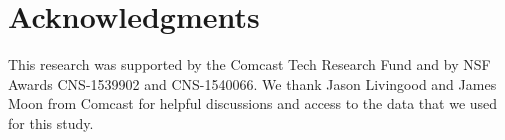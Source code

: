 \section*{Acknowledgments}

This research was supported by the Comcast Tech Research Fund and by NSF
Awards CNS-1539902 and CNS-1540066. We thank Jason Livingood and James
Moon from Comcast for helpful discussions and access to the data that we
used for this study.

